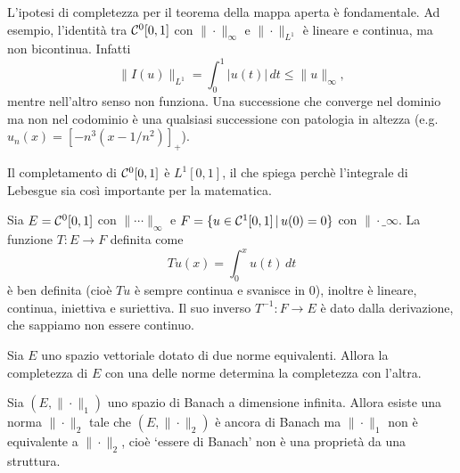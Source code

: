\begin{remark}
	L'ipotesi di completezza per il teorema della mappa aperta è fondamentale. Ad esempio, l'identità tra $\mathcal{C}^0[0,1]$ con $\|\cdot\|_\infty$ e $\|\cdot\|_{L^1}$ è lineare e continua, ma non bicontinua. Infatti
	\begin{equation*}
		\|I(u)\|_{L^1} = \int_0^1 |u(t)|\,dt \leq \|u\|_\infty,
	\end{equation*}
	mentre nell'altro senso non funziona. Una successione che converge nel dominio ma non nel codominio è una qualsiasi successione con patologia in altezza (e.g. $u_n(x) = [-n^3(x-1/n^2)]_+$).
\end{remark}

Il completamento di $\mathcal{C}^0[0,1]$ è $L^1[0,1]$, il che spiega perchè l'integrale di Lebesgue sia così importante per la matematica.

\begin{example}
	Sia $E = \mathcal{C}^0[0,1]$ con $\|\cdots\|_\infty$ e $F = \{ u \in \mathcal{C}^1[0,1] \,|\, u(0) = 0\}$ con $\|\cdot\_\infty$.
	La funzione $T:E \to F$ definita come
	\begin{equation*}
		Tu (x) = \int_0^x u(t)\,dt
	\end{equation*}
	è ben definita (cioè $Tu$ è sempre continua e svanisce in $0$), inoltre è lineare, continua, iniettiva e suriettiva. Il suo inverso $T^{-1} : F \to E$ è dato dalla derivazione, che sappiamo non essere continuo.
\end{example}

\begin{exercise}
	Sia $E$ uno spazio vettoriale dotato di due norme equivalenti.
	Allora la completezza di $E$ con una delle norme determina la completezza con l'altra.
\end{exercise}

\begin{remark}
	Sia $(E, \|\cdot\|_1)$ uno spazio di Banach a dimensione infinita.
	Allora esiste una norma $\|\cdot\|_2$ tale che $(E, \|\cdot\|_2)$ è ancora di Banach ma $\|\cdot\|_1$ non è equivalente a $\|\cdot\|_2$, cioè  `essere di Banach' non è una proprietà da una struttura.
\end{remark}


